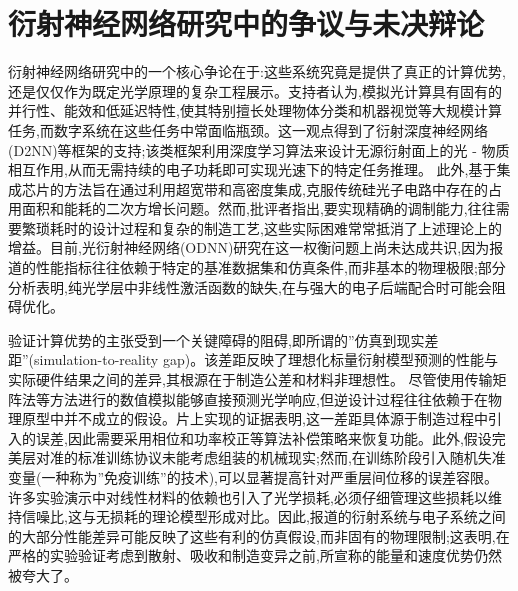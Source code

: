 \section{衍射神经网络研究中的争议与未决辩论}\label{ux884dux5c04ux795eux7ecfux7f51ux7edcux7814ux7a76ux4e2dux7684ux4e89ux8baeux4e0eux672aux51b3ux8fa9ux8bba}

衍射神经网络研究中的一个核心争论在于:这些系统究竟是提供了真正的计算优势,还是仅仅作为既定光学原理的复杂工程展示。支持者认为,模拟光计算具有固有的并行性、能效和低延迟特性,使其特别擅长处理物体分类和机器视觉等大规模计算任务,而数字系统在这些任务中常面临瓶颈。这一观点得到了衍射深度神经网络(D2NN)等框架的支持;该类框架利用深度学习算法来设计无源衍射面上的光 - 物质相互作用,从而无需持续的电子功耗即可实现光速下的特定任务推理。\citep{doi_10_1021_acsphotonics_4c01284_s001_10346917} 此外,基于集成芯片的方法旨在通过利用超宽带和高密度集成,克服传统硅光子电路中存在的占用面积和能耗的二次方增长问题。然而,批评者指出,要实现精确的调制能力,往往需要繁琐耗时的设计过程和复杂的制造工艺,这些实际困难常常抵消了上述理论上的增益。目前,光衍射神经网络(ODNN)研究在这一权衡问题上尚未达成共识,因为报道的性能指标往往依赖于特定的基准数据集和仿真条件,而非基本的物理极限;部分分析表明,纯光学层中非线性激活函数的缺失,在与强大的电子后端配合时可能会阻碍优化。\citep{doi_10_3390_nano14221812_4d7d91b1} \citep{doi_10_1515_nanoph_2022_0358_04e3cc8d} \citep{doi_10_1038_s41467_022_28702_0_1b79b43c} \citep{doi_10_1109_jstqe_2019_2921376_c2bef7d6}

验证计算优势的主张受到一个关键障碍的阻碍,即所谓的''仿真到现实差距''(simulation-to-reality gap)。该差距反映了理想化标量衍射模型预测的性能与实际硬件结果之间的差异,其根源在于制造公差和材料非理想性。\citep{doi_10_1117_12_3013482_d44587c1} \citep{doi_10_1117_12_3084472_3a4f4f5d} 尽管使用传输矩阵法等方法进行的数值模拟能够直接预测光学响应,但逆设计过程往往依赖于在物理原型中并不成立的假设。片上实现的证据表明,这一差距具体源于制造过程中引入的误差,因此需要采用相位和功率校正等算法补偿策略来恢复功能。此外,假设完美层对准的标准训练协议未能考虑组装的机械现实;然而,在训练阶段引入随机失准变量(一种称为''免疫训练''的技术),可以显著提高针对严重层间位移的误差容限。\citep{doi_10_1515_nanoph_2020_0291_c4a9f42d} 许多实验演示中对线性材料的依赖也引入了光学损耗,必须仔细管理这些损耗以维持信噪比,这与无损耗的理论模型形成对比。因此,报道的衍射系统与电子系统之间的大部分性能差异可能反映了这些有利的仿真假设,而非固有的物理限制;这表明,在严格的实验验证考虑到散射、吸收和制造变异之前,所宣称的能量和速度优势仍然被夸大了。\citep{doi_10_1016_j_isci_2025_112222_1f7c10f5} \citep{doi_10_1038_s41598_025_19638_8_1b2db1c9} \citep{doi_10_1515_nanoph_2020_0291_c4a9f42d} \citep{doi_10_1126_science_aat8084_e055772d} \citep{s2_94f3822c453a2ab6d44c59f1f60026acb15739af_1ae3e4a4}

